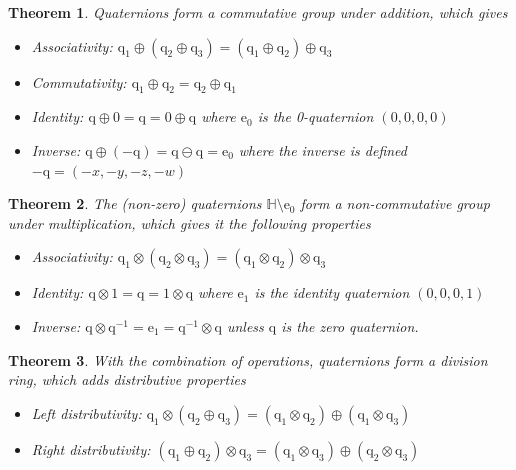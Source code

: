 \documentclass{amsart}
\newtheorem{theorem}{Theorem}[section]
\theoremstyle{definition}
\theoremstyle{remark}
\numberwithin{equation}{section}
\begin{document}
\begin{theorem}
  Quaternions form a commutative group under addition, which gives
  \begin{itemize}
    \item Associativity: $\mathrm{q}_1 \oplus (\mathrm{q}_2 \oplus \mathrm{q}_3) = (\mathrm{q}_1 \oplus \mathrm{q}_2) \oplus \mathrm{q}_3$
    \item Commutativity: $\mathrm{q}_1 \oplus \mathrm{q}_2 = \mathrm{q}_2 \oplus \mathrm{q}_1$
    \item Identity: $\mathrm{q} \oplus \mathrm{0} = \mathrm{q} = \mathrm{0} \oplus \mathrm{q}$ where $\mathrm{e}_0$ is the 0-quaternion $(0, 0, 0, 0)$
    \item Inverse: $\mathrm{q} \oplus (-\mathrm{q}) = \mathrm{q} \ominus \mathrm{q} = \mathrm{e}_0$ where the inverse is defined $-\mathrm{q}=(-x, -y, -z, -w)$
  \end{itemize}
\end{theorem}

\begin{theorem}
  The (non-zero) quaternions $\mathbb{H}\setminus{\mathrm{e}_0}$ form a \emph{non-commutative} group under multiplication, which gives it the following properties
  \begin{itemize}
    \item Associativity: $\mathrm{q}_1 \otimes (\mathrm{q}_2 \otimes \mathrm{q}_3) = (\mathrm{q}_1 \otimes \mathrm{q}_2) \otimes \mathrm{q}_3$
    \item Identity: $\mathrm{q} \otimes \mathrm{1} = \mathrm{q} = \mathrm{1} \otimes \mathrm{q}$ where $\mathrm{e}_1$ is the identity quaternion $(0, 0, 0, 1)$
  \item Inverse: $\mathrm{q} \otimes \mathrm{q}^{-1} = \mathrm{e}_1 = \mathrm{q}^{-1} \otimes \mathrm{q}$ unless $\mathrm{q}$ is the zero quaternion.
  \end{itemize}
\end{theorem}

\begin{theorem}
  With the combination of operations, quaternions form a division ring, which adds distributive properties
  \begin{itemize}
    \item Left distributivity: $\mathrm{q}_1 \otimes \left(\mathrm{q}_2 \oplus \mathrm{q}_3\right) = \left(\mathrm{q}_1 \otimes \mathrm{q}_2\right) \oplus \left(\mathrm{q}_1 \otimes \mathrm{q}_3\right)$
    \item Right distributivity: $\left(\mathrm{q}_1 \oplus \mathrm{q}_2\right) \otimes \mathrm{q}_3 = \left(\mathrm{q}_1 \otimes \mathrm{q}_3\right) \oplus \left(\mathrm{q}_2 \otimes \mathrm{q}_3\right)$
  \end{itemize}
\end{theorem}
\end{document}
